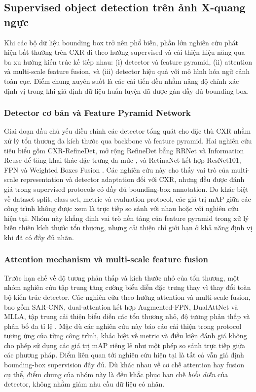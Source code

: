 \documentclass[pdflatex,sn-mathphys-num]{sn-jnl}%
\theoremstyle{thmstyleone}%
\theoremstyle{thmstyletwo}%
\theoremstyle{thmstylethree}%
\begin{document}
\subsection{Supervised object detection trên ảnh X-quang ngực}
\label{sec:supervised_cxr_detection}
 
Khi các bộ dữ liệu bounding box trở nên phổ biến, phần lớn nghiên cứu phát hiện
bất thường trên CXR đi theo hướng supervised và cải thiện hiệu năng qua ba xu
hướng kiến trúc kế tiếp nhau: (i) detector và feature pyramid, (ii) attention và
multi-scale feature fusion, và (iii) detector hiệu quả với mô hình hóa ngữ cảnh
toàn cục. Điểm chung xuyên suốt là các cải tiến đều nhằm nâng độ chính xác định
vị trong khi giả định dữ liệu huấn luyện đã được gán đầy đủ bounding box.
 
\subsubsection*{Detector cơ bản và Feature Pyramid Network}
Giai đoạn đầu chủ yếu điều chỉnh các detector tổng quát cho đặc thù CXR nhằm xử
lý tổn thương đa kích thước qua backbone và feature pyramid. Hai nghiên cứu tiêu biểu gồm CXR-RefineDet, mở rộng RefineDet bằng RRNet và
Information Reuse để tăng khai thác đặc trưng đa mức
\cite{lin2022cxr}, và RetinaNet kết hợp ResNet101, FPN và Weighted Boxes
Fusion \cite{ngo2023application}. Các nghiên cứu này cho thấy vai trò của
multi-scale representation và detector adaptation đối với CXR, nhưng đều
được đánh giá trong supervised protocols có đầy đủ bounding-box annotation.
Do khác biệt về dataset split, class set, metric và evaluation protocol, các
giá trị mAP giữa các công trình không được xem là trực tiếp so sánh với nhau
hoặc với nghiên cứu hiện tại. Nhóm này khẳng định vai trò nền tảng của feature pyramid
trong xử lý biến thiên kích thước tổn thương, nhưng cải thiện chỉ giới hạn ở khả
năng định vị khi đã có đầy đủ nhãn.
 
\subsubsection*{Attention mechanism và multi-scale feature fusion}
Trước hạn chế về độ tương phản thấp và kích thước nhỏ của tổn thương, một nhóm
nghiên cứu tập trung tăng cường biểu diễn đặc trưng thay vì thay đổi toàn bộ kiến
trúc detector. Các nghiên cứu theo hướng attention và multi-scale fusion, bao gồm SAR-CNN,
dual-attention kết hợp Augmented-FPN, DualAttNet và MLLA, tập trung cải thiện
biểu diễn các tổn thương nhỏ, độ tương phản thấp và phân bố đa tỉ lệ
\cite{lin2023lesion,liu2023anomaly,xu2024dualattnet,yuan2024multi}.
Mặc dù các nghiên cứu này báo cáo cải thiện trong protocol tương ứng của từng
công trình, khác biệt về metric và điều kiện đánh giá không cho phép sử dụng
các giá trị mAP riêng lẻ như một phép so sánh trực tiếp giữa các phương pháp.
Điểm liên quan tới nghiên cứu hiện tại là tất cả vẫn giả định bounding-box
supervision đầy đủ. Dù khác
nhau về cơ chế attention hay fusion cụ thể, điểm chung của nhóm này là đều khắc
phục hạn chế \emph{biểu diễn} của detector, không nhằm giảm nhu cầu dữ liệu có nhãn.
 
\end{document}
